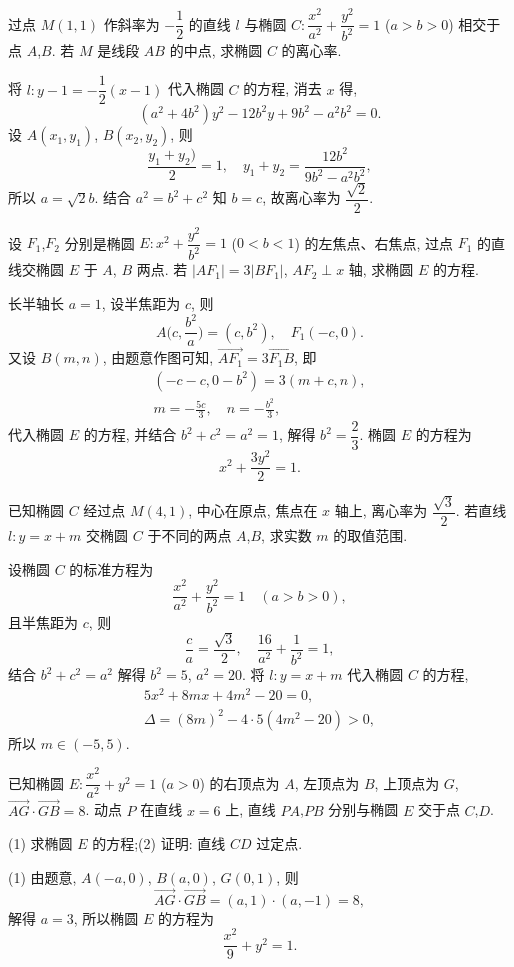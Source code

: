 \begin{exercise}
    过点 $M(1,1)$ 作斜率为 $-\dfrac12$ 的直线 $l$ 与椭圆 $C\colon \dfrac{x^2}{a^2}+\dfrac{y^2}{b^2}=1$ ($a>b>0$) 相交于点 $A$,$B$. 若 $M$ 是线段 $AB$ 的中点, 求椭圆 $C$ 的离心率.
\end{exercise}
\beginsolution
    将 $l\colon y-1= -\dfrac12(x-1)$ 代入椭圆 $C$ 的方程, 消去 $x$ 得,
    \[(a^2+4b^2)y^2- 12b^2y+ 9b^2-a^2b^2= 0.\]
    设 $A(x_1,y_1)$, $B(x_2,y_2)$, 则
    \[\frac{y_1+y_2)}{2}= 1,\quad
    y_1+y_2= \frac{12b^2}{9b^2-a^2b^2},\]
    所以 $a=\sqrt2b$. 结合 $a^2= b^2+c^2$ 知 $b=c$, 故离心率为 $\dfrac{\sqrt2}2$.
\endsolution

\begin{exercise}
    设 $F_1$,$F_2$ 分别是椭圆 $E\colon x^2+\dfrac{y^2}{b^2}=1$ ($0<b<1$) 的左焦点、右焦点, 过点 $F_1$ 的直线交椭圆 $E$ 于 $A$, $B$ 两点. 若 $|AF_1| =3|BF_1|$, $AF_2\perp x$ 轴, 求椭圆 $E$ 的方程.
\end{exercise}
\beginsolution
    长半轴长 $a=1$, 设半焦距为 $c$, 则
    \[A\biggl(c,\frac{b^2}{a}\biggr)= (c,b^2),\quad
        F_1(-c,0).\]
    又设 $B(m,n)$, 由题意作图可知, $\overrightarrow{AF_1}= 3\overrightarrow{F_1B}$, 即
    \[\begin{gathered}
        (-c-c,0-b^2)= 3(m+c,n),\\
        m= -\frac{5c}{3},\quad n= -\frac{b^2}{3},
    \end{gathered}\]
    代入椭圆 $E$ 的方程, 并结合 $b^2+c^2=a^2=1$, 解得 $b^2= \dfrac23$. 椭圆 $E$ 的方程为
    \[x^2+ \frac{3y^2}{2}= 1.\]
\endsolution

\begin{exercise}
    已知椭圆 $C$ 经过点 $M(4,1)$, 中心在原点, 焦点在 $x$ 轴上, 离心率为 $\dfrac{\sqrt3}2$. 若直线 $l\colon y=x+m$ 交椭圆 $C$ 于不同的两点 $A$,$B$, 求实数 $m$ 的取值范围.
\end{exercise}
\beginsolution
    设椭圆 $C$ 的标准方程为
    \[\frac{x^2}{a^2}+ \frac{y^2}{b^2}=1\quad (a>b>0),\]
    且半焦距为 $c$, 则
    \[\frac{c}{a}= \frac{\sqrt3}{2},\quad
    \frac{16}{a^2}+ \frac{1}{b^2}=1,\]
    结合 $b^2+c^2=a^2$ 解得 $b^2= 5$, $a^2= 20$. 将 $l\colon y=x+m$ 代入椭圆 $C$ 的方程,
    \[\begin{gathered}
        5x^2+ 8mx+ 4m^2-20= 0,\\
        \Delta= (8m)^2- 4\cdot 5(4m^2-20)>0,
    \end{gathered}\]
    所以 $m\in (-5,5)$.
\endsolution

\begin{exercise}
    已知椭圆 $E\colon \dfrac{x^2}{a^2}+y^2= 1$ ($a>0$) 的右顶点为 $A$, 左顶点为 $B$, 上顶点为 $G$, $\overrightarrow{AG}\cdot \overrightarrow{GB}= 8$. 动点 $P$ 在直线 $x=6$ 上, 直线 $PA$,$PB$ 分别与椭圆 $E$ 交于点 $C$,$D$.

    (1) 求椭圆 $E$ 的方程;\qquad (2) 证明: 直线 $CD$ 过定点.
\end{exercise}
\beginsolution
    (1) 由题意, $A(-a,0)$, $B(a,0)$, $G(0,1)$, 则
    \[\overrightarrow{AG}\cdot \overrightarrow{GB}
    = (a,1)\cdot (a,-1)= 8,\]
    解得 $a=3$, 所以椭圆 $E$ 的方程为
    \[\dfrac{x^2}9+ y^2= 1.\]

